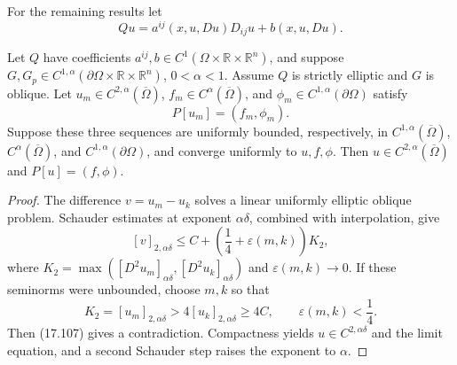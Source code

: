 For the remaining results let
\begin{equation}\tag{17.106}
Qu=a^{ij}(x,u,Du)D_{ij}u+b(x,u,Du).
\end{equation}

\begin{lemma}
\label{gt-ch17-lem-closedness-quasilinear-oblique-problems}
Let $Q$ have coefficients $a^{ij},b\in C^1(\Omega\times\mathbb R\times
\mathbb R^n)$, and suppose $G,G_p\in C^{1,\alpha}(\partial\Omega\times
\mathbb R\times\mathbb R^n)$, $0<\alpha<1$.  Assume $Q$ is strictly
elliptic and $G$ is oblique.  Let
$u_m\in C^{2,\alpha}(\overline\Omega)$,
$f_m\in C^\alpha(\overline\Omega)$, and
$\phi_m\in C^{1,\alpha}(\partial\Omega)$ satisfy
\[
P[u_m]=(f_m,\phi_m).
\]
Suppose these three sequences are uniformly bounded, respectively, in
$C^{1,\alpha}(\overline\Omega)$, $C^\alpha(\overline\Omega)$, and
$C^{1,\alpha}(\partial\Omega)$, and converge uniformly to $u,f,\phi$.
Then $u\in C^{2,\alpha}(\overline\Omega)$ and $P[u]=(f,\phi)$.
\end{lemma}
\begin{proof}
\sketch The difference $v=u_m-u_k$ solves a linear uniformly elliptic
oblique problem.  Schauder estimates at exponent $\alpha\delta$, combined
with interpolation, give
\begin{equation}\tag{17.107}
[v]_{2,\alpha\delta}\le C+\left(\frac14+\varepsilon(m,k)\right)K_2,
\end{equation}
where $K_2=\max([D^2u_m]_{\alpha\delta},[D^2u_k]_{\alpha\delta})$ and
$\varepsilon(m,k)\to0$.  If these seminorms were unbounded, choose $m,k$ so
that
\begin{equation}
\tag{17.108}
K_2=[u_m]_{2,\alpha\delta}>4[u_k]_{2,\alpha\delta}\geq4C,
\qquad\varepsilon(m,k)<\frac14.
\end{equation}
Then (17.107) gives a
contradiction.  Compactness yields $u\in C^{2,\alpha\delta}$ and the limit
equation, and a second Schauder step raises the exponent to $\alpha$.
\end{proof}

